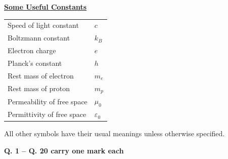 \documentclass[14pt, a4paper]{extarticle}
\begin{document}
\begin{center}
    
    {\Large \underline{\textbf{Some Useful Constants}}}
    \vspace{1em}
   
    \begin{tabular}{l @{ : }  l}
        Speed of light constant & $c$ \\
        Boltzmann constant & $k_B$ \\
        Electron charge & $e$ \\
        Planck's constant & $h$ \\
        Rest mass of electron & $m_e$ \\
        Rest mass of proton & $m_p$ \\
        Permeability of free space & $\mu_0$ \\
        Permittivity of free space & $\varepsilon_0$ \\
    \end{tabular}
    
    \vspace{1.5em}
    
    All other symbols have their usual meanings unless otherwise specified.
    
\end{center}

\vspace{1em}
\noindent
\textbf{Q. 1 -- Q. 20 carry one mark each}
\end{document}

